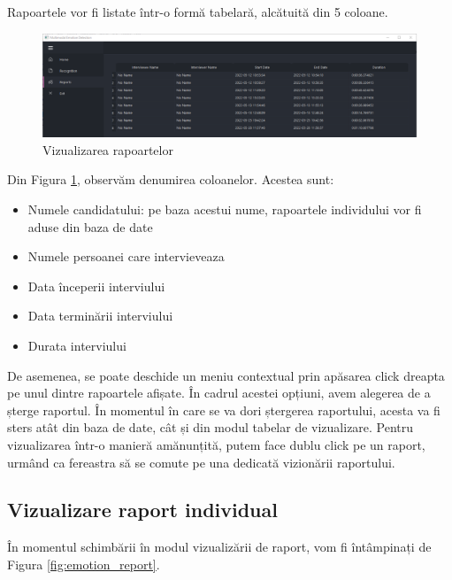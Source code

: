 \documentclass[a4paper, 12pt]{report}
\begin{document}
	Rapoartele vor fi listate într-o formă tabelară, alcătuită din 5 coloane.
	
	\begin{figure}[H]
		\begin{center}
			\includegraphics[scale=0.35]{images/reports.png}
		\end{center}
		\caption{Vizualizarea rapoartelor}
		\label{fig:emotion_reports}
	\end{figure}

	Din Figura \ref{fig:emotion_reports}, observăm denumirea coloanelor. Acestea sunt:
	
	\begin{itemize}
		\item Numele candidatului: pe baza acestui nume, rapoartele individului vor fi aduse din baza de date
		\item Numele persoanei care intervieveaza
		\item Data începerii interviului
		\item Data terminării interviului
		\item Durata interviului
	\end{itemize}
	
	De asemenea, se poate deschide un meniu contextual prin apăsarea click dreapta pe unul dintre rapoartele afișate. În cadrul acestei opțiuni, avem alegerea de a șterge raportul. În momentul în care se va dori ștergerea raportului, acesta va fi sters atât din baza de date, cât și din modul tabelar de vizualizare. Pentru vizualizarea într-o manieră amănunțită, putem face dublu click pe un raport, urmând ca fereastra să se comute pe una dedicată vizionării raportului.
	
	\clearpage
	\subsection{Vizualizare raport individual}
	În momentul schimbării în modul vizualizării de raport, vom fi întâmpinați de Figura \ref{fig:emotion_report}.
	
\end{document}
